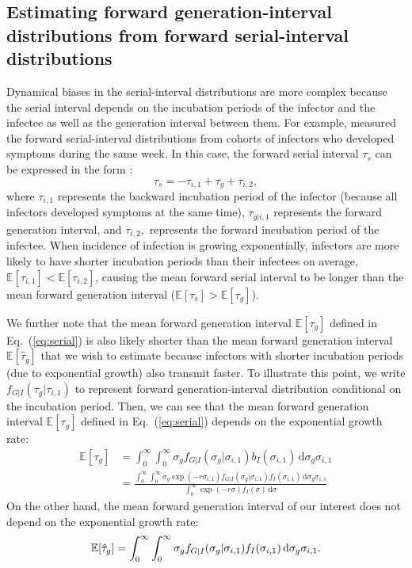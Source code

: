 \documentclass[12pt]{article}
\newcommand{\eref}[1]{Eq.~(\ref{eq:#1})}
\newcommand{\dd}[1]{\ensuremath{\, \mathrm{d}#1}}
\newcommand{\dsigma}{\dd{\sigma}}
\begin{document}
\subsection{Estimating forward generation-interval distributions from forward serial-interval distributions}

Dynamical biases in the serial-interval distributions are more complex because the serial interval depends on the incubation periods of the infector and the infectee as well as the generation interval between them.
For example, \cite{backer2021omicron} measured the forward serial-interval distributions from cohorts of infectors who developed symptoms during the same week.
In this case, the forward serial interval $\tau_s$ can be expressed in the form \citep{park2021forward}:
\begin{equation}
\tau_s =  - \tau_{i, 1} + \tau_{g} + \tau_{i, 2},
\label{eq:serial}
\end{equation}
where $\tau_{i, 1}$ represents the backward incubation period of the infector (because all infectors developed symptoms at the same time), $\tau_{g|i,1}$ represents the forward generation interval, and $\tau_{i, 2},$ represents the forward incubation period of the infectee.
When incidence of infection is growing exponentially, infectors are more likely to have shorter incubation periods than their infectees on average, $\mathbb E[\tau_{i, 1}] < \mathbb E[\tau_{i, 2}]$, causing the mean forward serial interval to be longer than the mean forward generation interval ($\mathbb E[\tau_s] > \mathbb E[\tau_{g}]$).

We further note that the mean forward generation interval $\mathbb E[\tau_{g}]$ defined in \eref{serial} is also likely shorter than the mean forward generation interval $\mathbb E[\hat{\tau}_{g}]$ that we wish to estimate because infectors with shorter incubation periods (due to exponential growth) also transmit faster.
To illustrate this point, we write $f_{G|I}(\tau_g|\tau_{i,1})$ to represent forward generation-interval distribution conditional on the incubation period.
Then, we can see that the mean forward generation interval $\mathbb E[\tau_{g}]$ defined in \eref{serial} depends on the exponential growth rate:
\begin{align}
\mathbb E[\tau_{g}] &= \int_0^\infty \int_0^\infty \sigma_g f_{G|I}(\sigma_g|\sigma_{i,1}) b_I(\sigma_{i,1}) \dd \sigma_g \sigma_{i, 1}\\
&= \frac{\int_0^\infty \int_0^\infty \sigma_g \exp(-r\sigma_{i,1})  f_{G|I}(\sigma_g|\sigma_{i,1}) f_I(\sigma_{i,1}) \dd \sigma_g \sigma_{i, 1}}{\int_0^\infty  \exp(-r\sigma) f_I(\sigma) \dsigma}
\end{align}
On the other hand, the mean forward generation interval of our interest does not depend on the exponential growth rate:
\begin{equation}
\mathbb E[\hat{\tau}_{g}] = \int_0^\infty \int_0^\infty \sigma_g f_{G|I}(\sigma_g|\sigma_{i,1}) f_I(\sigma_{i,1}) \dd \sigma_g \sigma_{i, 1}.\\
\end{equation}
\end{document}
